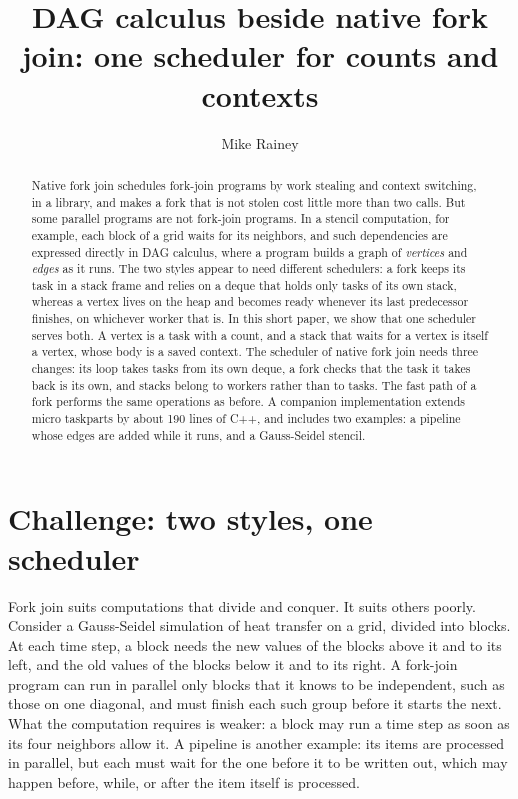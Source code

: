 \documentclass[sigplan,nonacm]{acmart}
\title{DAG calculus beside native fork join: one scheduler for counts and contexts}
\author{Mike Rainey}
\begin{document}
\begin{abstract}
Native fork join schedules fork-join programs by work stealing and
context switching, in a library, and makes a fork that is not stolen
cost little more than two calls.
%
But some parallel programs are not fork-join programs.
%
In a stencil computation, for example, each block of a grid waits for
its neighbors, and such dependencies are expressed directly in DAG
calculus, where a program builds a graph of \emph{vertices} and
\emph{edges} as it runs.
%
The two styles appear to need different schedulers: a fork keeps its
task in a stack frame and relies on a deque that holds only tasks of
its own stack, whereas a vertex lives on the heap and becomes ready
whenever its last predecessor finishes, on whichever worker that is.
%
In this short paper, we show that one scheduler serves both.
%
A vertex is a task with a count, and a stack that waits for a vertex
is itself a vertex, whose body is a saved context.
%
The scheduler of native fork join needs three changes: its loop takes
tasks from its own deque, a fork checks that the task it takes back is
its own, and stacks belong to workers rather than to tasks.
%
The fast path of a fork performs the same operations as before.
%
A companion implementation extends micro taskparts by about 190 lines
of C++, and includes two examples: a pipeline whose edges are added
while it runs, and a Gauss-Seidel stencil.
\end{abstract}

\maketitle

\section{Challenge: two styles, one scheduler}

Fork join suits computations that divide and conquer.
%
It suits others poorly.
%
Consider a Gauss-Seidel simulation of heat transfer on a grid, divided
into blocks.
%
At each time step, a block needs the new values of the blocks above it
and to its left, and the old values of the blocks below it and to its
right.
%
A fork-join program can run in parallel only blocks that it knows to be
independent, such as those on one diagonal, and must finish each such
group before it starts the next.
%
What the computation requires is weaker: a block may run a time step as
soon as its four neighbors allow it.
%
A pipeline is another example: its items are processed in parallel,
but each must wait for the one before it to be written out, which may
happen before, while, or after the item itself is processed.
\end{document}

